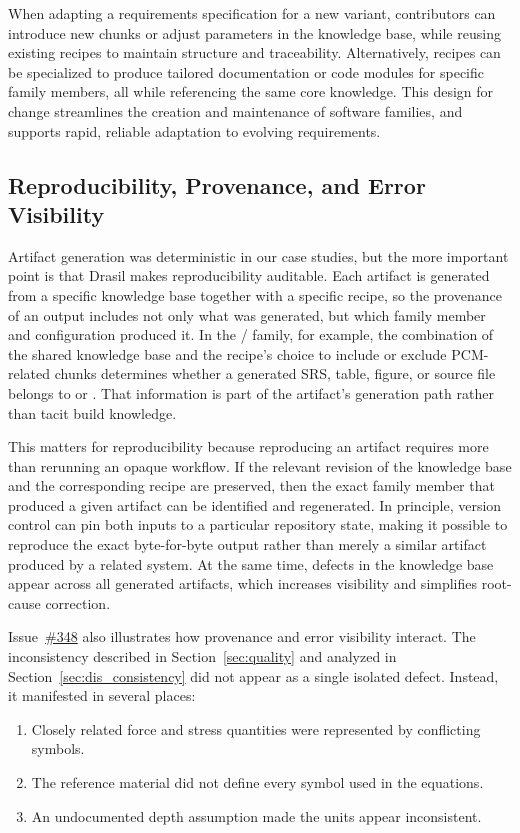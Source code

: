 When adapting a requirements specification for a new variant, contributors
can introduce new chunks or adjust parameters in the knowledge base, while
reusing existing recipes to maintain structure and traceability.
Alternatively, recipes can be specialized to produce tailored documentation
or code modules for specific family members, all while referencing the same
core knowledge. This design for change streamlines the creation and
maintenance of software families, and supports rapid, reliable adaptation to
evolving requirements.

\subsection{Reproducibility, Provenance, and Error Visibility}
\label{sec:dis_reproducibility}
Artifact generation was deterministic in our case studies, but the more
important point is that Drasil makes reproducibility auditable. Each artifact
is generated from a specific knowledge base together with a specific recipe, so
the provenance of an output includes not only what was generated, but which
family member and configuration produced it. In the \sw{}/\np{} family, for
example, the combination of the shared knowledge base and the recipe's choice
to include or exclude PCM-related chunks determines whether a generated SRS,
table, figure, or source file belongs to \sw{} or \np{}. That information is
part of the artifact's generation path rather than tacit build knowledge.

This matters for reproducibility because reproducing an artifact requires more
than rerunning an opaque workflow. If the relevant revision of the knowledge
base and the corresponding recipe are preserved, then the exact family member
that produced a given artifact can be identified and regenerated. In principle,
version control can pin both inputs to a particular repository state, making it
possible to reproduce the exact byte-for-byte output rather than merely a
similar artifact produced by a related system. At the same time, defects in
the knowledge base appear across all generated artifacts, which increases
visibility and simplifies root-cause correction.

Issue~\href{https://github.com/JacquesCarette/Drasil/issues/348}{\#348}
also illustrates how provenance and error visibility interact. The
inconsistency described in Section~\ref{sec:quality} and analyzed in
Section~\ref{sec:dis_consistency} did not appear as a single isolated defect.
Instead, it manifested in several places:
\begin{enumerate}
\item Closely related force and stress quantities were represented by
conflicting symbols.
\item The reference material did not define every symbol used in the equations.
\item An undocumented depth assumption made the units appear inconsistent.
\end{enumerate}

